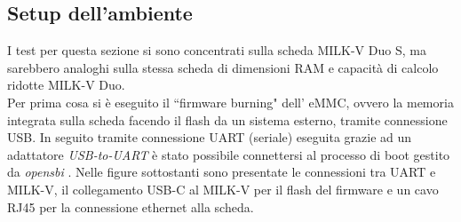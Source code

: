 \subsection*{Setup dell'ambiente}
I test per questa sezione si sono concentrati sulla scheda MILK-V Duo S, ma sarebbero analoghi sulla stessa scheda di dimensioni RAM e capacità di calcolo ridotte MILK-V Duo.\\
Per prima cosa si è eseguito il ``firmware burning" dell' eMMC, ovvero la memoria integrata sulla scheda facendo il flash da un sistema esterno, tramite connessione USB. In seguito tramite connessione UART \cite{rohdeschwarz}(seriale) eseguita grazie ad un adattatore \textit{USB-to-UART} è stato possibile connettersi al processo di boot gestito da \textit{opensbi} \cite{OpenSBI}. Nelle figure sottostanti sono presentate le connessioni tra UART e MILK-V, il collegamento USB-C al MILK-V per il flash del firmware e un cavo RJ45 per la connessione ethernet alla scheda.
\FloatBarrier
\vspace{1cm}
